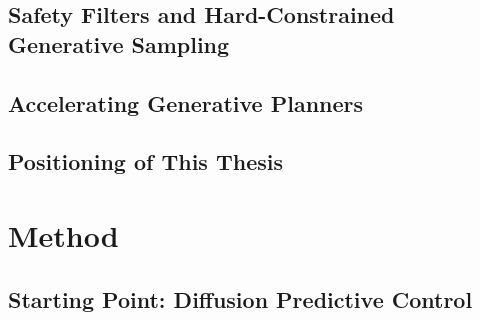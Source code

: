 \documentclass[headsepline,footsepline,footinclude=false,oneside,fontsize=11pt,paper=a4,listof=totoc,bibliography=totoc]{scrbook}
\begin{document}
\section{Safety Filters and Hard-Constrained Generative Sampling}\label{sec:rel:safety}
\section{Accelerating Generative Planners}\label{sec:rel:speed}
\section{Positioning of This Thesis}\label{sec:rel:positioning}

\chapter{Method}\label{ch:method}

\section{Starting Point: Diffusion Predictive Control}\label{sec:method:dpcc}
\end{document}

